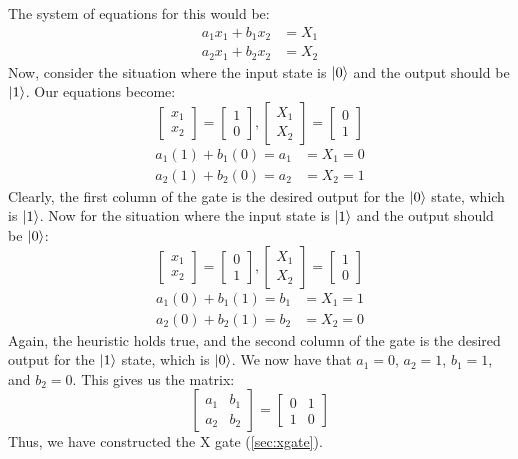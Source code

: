 \documentclass{article}
\begin{document}
The system of equations for this would be:
\begin{align*}
	a_{1}x_{1} + b_{1}x_{2} &= X_{1} \\
	a_{2}x_{1} + b_{2}x_{2} &= X_{2}
\end{align*}
Now, consider the situation where the input state is $\ket{0}$ and the output should be $\ket{1}$.
Our equations become:
\[
	\begin{bmatrix}
		x_{1} \\
		x_{2}
	\end{bmatrix}
	=
	\begin{bmatrix}
		1 \\
		0
	\end{bmatrix}
	,
	\begin{bmatrix}
		X_{1} \\
		X_{2}
	\end{bmatrix}
	=
	\begin{bmatrix}
		0 \\
		1
	\end{bmatrix}
\]
\begin{align*}
	a_{1}(1) + b_{1}(0) = a_{1} &= X_{1} = 0 \\
	a_{2}(1) + b_{2}(0) = a_{2} &= X_{2} = 1
\end{align*}
Clearly, the first column of the gate is the desired output for the $\ket{0}$ state, which is $\ket{1}$.
Now for the situation where the input state is $\ket{1}$ and the output should be $\ket{0}$:
\[
	\begin{bmatrix}
		x_{1} \\
		x_{2}
	\end{bmatrix}
	=
	\begin{bmatrix}
		0 \\
		1
	\end{bmatrix}
	,
	\begin{bmatrix}
		X_{1} \\
		X_{2}
	\end{bmatrix}
	=
	\begin{bmatrix}
		1 \\
		0
	\end{bmatrix}
\]
\begin{align*}
	a_{1}(0) + b_{1}(1) = b_{1} &= X_{1} = 1 \\
	a_{2}(0) + b_{2}(1) = b_{2} &= X_{2} = 0
\end{align*}
Again, the heuristic holds true, and the second column of the gate is the desired output for the $\ket{1}$ state, which is $\ket{0}$.
We now have that $a_{1} = 0$, $a_{2} = 1$, $b_{1} = 1$, and $b_{2} = 0$. This gives us the matrix:
\[
	\begin{bmatrix}
		a_{1} & b_{1} \\
		a_{2} & b_{2}
	\end{bmatrix}
	=
	\begin{bmatrix}
		0 & 1 \\
		1 & 0
	\end{bmatrix}
\]
Thus, we have constructed the X gate (\ref{sec:xgate}).
\end{document}
